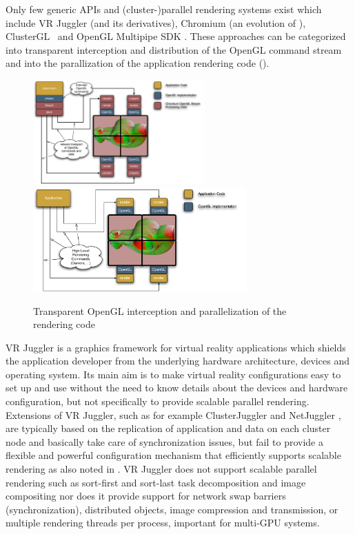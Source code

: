 Only few generic APIs and (cluster-)parallel rendering systems exist which
include VR Juggler \cite{BJHMBC:01} (and its derivatives), Chromium
\cite{HHNFAKK:02} (an evolution of \cite{Humphreys99,Humphreys00,HEBSEH:01}),
{ClusterGL}~\cite{NHM:11} and OpenGL Multipipe SDK
\cite{JDBJBCER:04,BRE:05,MPK}. These approaches can be categorized into
transparent interception and distribution of the OpenGL command stream and into
the parallization of the application rendering code ().

\begin{figure}[ht]
 \includegraphics[height=4cm]{images/Chromium}\hfil%
 \includegraphics[height=4cm]{images/MPK}%
 \caption{Transparent OpenGL interception and parallelization of the rendering code\label{fChromium}}
\end{figure}


VR Juggler \cite{BJHMBC:01,JBBC:98} is a graphics framework for virtual reality
applications which shields the application developer from the underlying
hardware architecture, devices and operating system. Its main aim is to make
virtual reality configurations easy to set up and use without the need to know
details about the devices and hardware configuration, but not specifically to
provide scalable parallel rendering. Extensions of VR Juggler, such as for
example ClusterJuggler \cite{BC:03} and NetJuggler \cite{AGLMR:02}, are
typically based on the replication of application and data on each cluster node
and basically take care of synchronization issues, but fail to provide a
flexible and powerful configuration mechanism that efficiently supports scalable
rendering as also noted in \cite{SWNH:03}. VR Juggler does not support scalable
parallel rendering such as sort-first and sort-last task decomposition and image
compositing nor does it provide support for network swap barriers
(synchronization), distributed objects, image compression and transmission, or
multiple rendering threads per process, important for multi-GPU systems.

